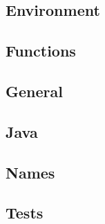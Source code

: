 \documentclass[a4paper, twocolumn]{article}
\begin{document}
\subsection{Environment}

\subsection{Functions}

\subsection{General}

\subsection{Java}

\subsection{Names}

\subsection{Tests}
\end{document}
